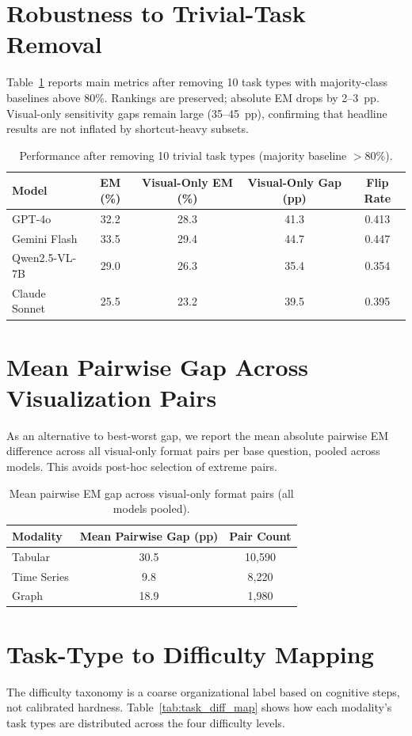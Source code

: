 \documentclass{article}
\begin{document}
\section{Robustness to Trivial-Task Removal}
Table~\ref{tab:pruned} reports main metrics after removing 10 task types with majority-class baselines above 80\%. Rankings are preserved; absolute EM drops by 2--3~pp. Visual-only sensitivity gaps remain large (35--45~pp), confirming that headline results are not inflated by shortcut-heavy subsets.

\begin{table}[h]
\centering
\small
\caption{Performance after removing 10 trivial task types (majority baseline $>$80\%).}
\label{tab:pruned}
\begin{tabular}{lcccc}
\toprule
Model & EM (\%) & Visual-Only EM (\%) & Visual-Only Gap (pp) & Flip Rate \\
\midrule
GPT-4o & 32.2 & 28.3 & 41.3 & 0.413 \\
Gemini Flash & 33.5 & 29.4 & 44.7 & 0.447 \\
Qwen2.5-VL-7B & 29.0 & 26.3 & 35.4 & 0.354 \\
Claude Sonnet & 25.5 & 23.2 & 39.5 & 0.395 \\
\bottomrule
\end{tabular}
\end{table}

\section{Mean Pairwise Gap Across Visualization Pairs}
As an alternative to best-worst gap, we report the mean absolute pairwise EM difference across all visual-only format pairs per base question, pooled across models. This avoids post-hoc selection of extreme pairs.

\begin{table}[h]
\centering
\small
\caption{Mean pairwise EM gap across visual-only format pairs (all models pooled).}
\begin{tabular}{lcc}
\toprule
Modality & Mean Pairwise Gap (pp) & Pair Count \\
\midrule
Tabular & 30.5 & 10,590 \\
Time Series & 9.8 & 8,220 \\
Graph & 18.9 & 1,980 \\
\bottomrule
\end{tabular}
\end{table}

\section{Task-Type to Difficulty Mapping}
The difficulty taxonomy is a coarse organizational label based on cognitive steps, not calibrated hardness. Table~\ref{tab:task_diff_map} shows how each modality's task types are distributed across the four difficulty levels.
\end{document}
